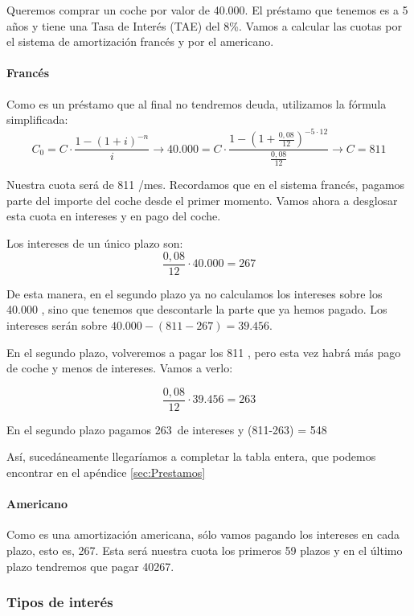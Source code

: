 \documentclass[nochap,palatino,shortheader]{apuntes}
\begin{document}
\begin{example}
Queremos comprar un coche por valor de 40.000\texteuro. El préstamo que tenemos es a 5 años y tiene una Tasa de Interés (TAE) del 8\%.
Vamos a calcular las cuotas por el sistema de amortización francés y por el americano.

\paragraph{Francés}
Como es un préstamo que al final no tendremos deuda, utilizamos la fórmula simplificada:
\[C_0 = C·\frac{1-(1+i)^{-n}}{i} \to 40.000 = C·\frac{1-\left(1+\frac{0,08}{12}\right)^{-5·12}}{\frac{0,08}{12}} \to C = 811 \]

Nuestra cuota será de 811 \texteuro/mes. Recordamos que en el sistema francés, pagamos parte del importe del coche desde el primer momento. Vamos ahora a desglosar esta cuota en intereses y en pago del coche.

Los intereses de un único plazo son: \[\frac{0,08}{12}·40.000 = 267\]

De esta manera, en el segundo plazo ya no calculamos los intereses sobre los 40.000 \texteuro, sino que tenemos que descontarle la parte que ya hemos pagado. Los intereses serán sobre $40.000 - (811-267) = 39.456$.

En el segundo plazo, volveremos a pagar los 811 \texteuro, pero esta vez habrá más pago de coche y menos de intereses. Vamos a verlo:

\[
\frac{0,08}{12} · 39.456 = 263
\]

En el segundo plazo pagamos 263\texteuro\ de intereses y (811-263) = 548 \texteuro

Así, sucedáneamente llegaríamos a completar la tabla entera, que podemos encontrar en el apéndice \ref{sec:Prestamos}

\paragraph{Americano} Como es una amortización americana, sólo vamos pagando los intereses en cada plazo, esto es, 267\texteuro. Esta será nuestra cuota los primeros 59 plazos y en el último plazo tendremos que pagar 40267\texteuro.
\end{example}


\subsubsection{Tipos de interés}\label{sec:TiposInteres}
\end{document}
